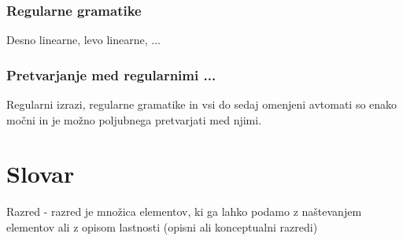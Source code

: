 \documentclass[10pt,a4paper,oneside]{book}
\begin{document}
\subsection{Regularne gramatike}
Desno linearne, levo linearne, ...
	
\subsection{Pretvarjanje med regularnimi ...}
Regularni izrazi, regularne gramatike in vsi do sedaj omenjeni avtomati so enako močni in je možno poljubnega pretvarjati med njimi.


\pagebreak

\chapter{Slovar}
\begin{items}
\item Razred - razred je množica elementov, ki ga lahko podamo z naštevanjem elementov ali z opisom lastnosti (opisni ali konceptualni razredi)
\end{items}
\end{document}
